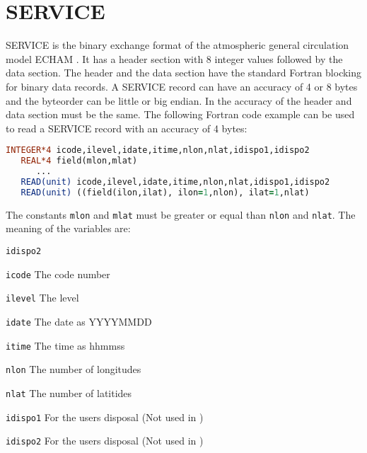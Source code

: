 

\section{SERVICE}

SERVICE is the binary exchange format of the atmospheric general circulation model ECHAM \cite{ECHAM}.
It has a header section with 8 integer values followed by the data section.
The header and the data section have the standard Fortran blocking for binary data records.
A SERVICE record can have an accuracy of 4 or 8 bytes and the byteorder can be little or big endian.
In {\CDI} the accuracy of the header and data section must be the same.
The following Fortran code example can be used to read a SERVICE record with an accuracy of 4 bytes:

\begin{lstlisting}[language=Fortran, backgroundcolor=\color{pyellow}, basicstyle=\small, columns=flexible]
   INTEGER*4 icode,ilevel,idate,itime,nlon,nlat,idispo1,idispo2
   REAL*4 field(mlon,mlat)
      ...
   READ(unit) icode,ilevel,idate,itime,nlon,nlat,idispo1,idispo2
   READ(unit) ((field(ilon,ilat), ilon=1,nlon), ilat=1,nlat)
\end{lstlisting}

The constants \texttt{mlon} and \texttt{mlat} must be greater or equal than \texttt{nlon} and \texttt{nlat}.
The meaning of the variables are:

\vspace*{3mm}
\hspace*{8mm}\begin{minipage}{10cm}
\begin{deflist}{\texttt{idispo2 \ \ }}
\item[\texttt{icode}]    The code number
\item[\texttt{ilevel}]   The level
\item[\texttt{idate}]    The date as YYYYMMDD
\item[\texttt{itime}]    The time as hhmmss
\item[\texttt{nlon}]     The number of longitudes
\item[\texttt{nlat}]     The number of latitides
\item[\texttt{idispo1}]  For the users disposal (Not used in {\CDI})
\item[\texttt{idispo2}]  For the users disposal (Not used in {\CDI})
\end{deflist}
\end{minipage}
\vspace*{3mm}

